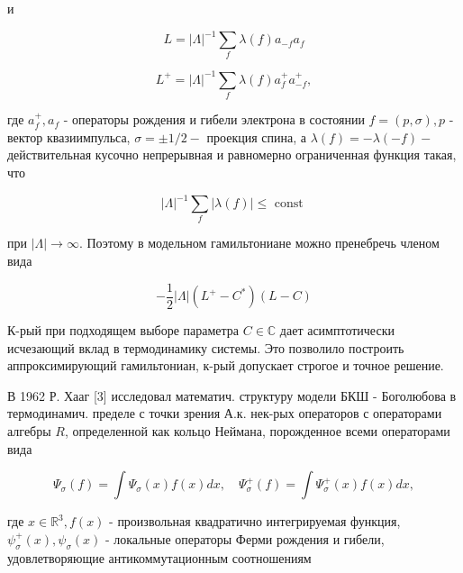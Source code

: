 \documentclass[10pt]{article}
\begin{document}
и



\[

L=|\Lambda|^{-1} \sum_{f} \lambda(f) a_{-f} a_{f}

\]



\[

L^{+}=|\Lambda|^{-1} \sum_{f} \lambda(f) a_{f}^{+} a_{-f}^{+},

\]



где $a_{f}^{+}, a_{f}$ - операторы рождения и гибели электрона в состоянии $f=(p, \sigma), p$ - вектор квазиимпульса, $\sigma= \pm 1 / 2-$ проекция спина, а $\lambda(f)=-\lambda(-f)-$ действительная кусочно непрерывная и равномерно ограниченная функция такая, что



\[

|\Lambda|^{-1} \sum_{f}|\lambda(f)| \leqslant \text { const }

\]



при $|\Lambda| \rightarrow \infty$. Поэтому в модельном гамильтониане можно пренебречь членом вида



\[

-\frac{1}{2}|\Lambda|\left(L^{+}-C^{*}\right)(L-C)

\]



К-рый при подходящем выборе параметра $C \in \mathbb{C}$ дает асимптотически исчезающий вклад в термодинамику системы. Это позволило построить аппроксимирующий гамильтониан, к-рый допускает строгое и точное решение.



В 1962 Р. Хааг [3] исследовал математич. структуру модели БКШ - Боголюбова в термодинамич. пределе с точки зрения А.к. нек-рых операторов с операторами алгебры $R$, определенной как кольцо Неймана, порожденное всеми операторами вида



\[

\Psi_{\sigma}(f)=\int \Psi_{\sigma}(x) f(x) d x, \quad \Psi_{\sigma}^{+}(f)=\int \Psi_{\sigma}^{+}(x) f(x) d x,

\]



где $x \in \mathbb{R}^{3}, f(x)$ - произвольная квадратично интегрируемая функция, $\psi_{\sigma}^{+}(x), \psi_{\sigma}(x)$ - локальные операторы Ферми рождения и гибели, удовлетворяющие антикоммутационным соотношениям
\end{document}
